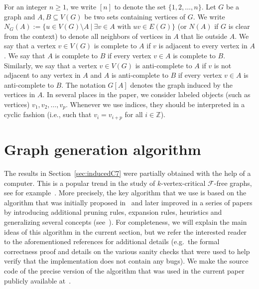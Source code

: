 \documentclass[11pt,a4paper]{article}
\theoremstyle{definition}
\begin{document}
For an integer $n \geq 1$, we write $[n]$ to denote the set $\{1,2,\ldots,n\}$. Let $G$ be a graph and $A, B \subseteq V(G)$ be two sets containing vertices of $G$. We write $N_G(A) := \{u \in V(G) \setminus A~|~ \exists v \in A\text{ with }uv\in E(G)\}$ (or $N(A)$ if $G$ is clear from the context) to denote all neighbors of vertices in $A$ that lie outside $A$. We say that a vertex $v \in V(G)$ is complete to $A$ if $v$ is adjacent to every vertex in $A$. We say that $A$ is complete to $B$ if every vertex $v \in A$ is complete to $B$. Similarly, we say that a vertex $v \in V(G)$ is anti-complete to $A$ if $v$ is not adjacent to any vertex in $A$ and $A$ is anti-complete to $B$ if every vertex $v \in A$ is anti-complete to $B$. The notation $G[A]$ denotes the graph induced by the vertices in $A$. In several places in the paper, we consider labeled objects (such as vertices) $v_1, v_2, \ldots, v_p$. Whenever we use indices, they should be interpreted in a cyclic fashion (i.e., such that $v_i = v_{i+p}$ for all $i \in \mathbb{Z}$).


\section{Graph generation algorithm}\label{sec:algo}
The results in Section~\ref{sec:inducedC7} were partially obtained with the help of a computer. This is a popular trend in the study of $k$-vertex-critical $\mathcal{F}$-free graphs, see for example~\cite{J25}. More precisely, the key algorithm that we use is based on the algorithm that was initially proposed in~\cite{HKLSS10} and later improved in a series of papers by introducing additional pruning rules, expansion rules, heuristics and generalizing several concepts (see~\cite{GS18,GJORS24,XJGH23,XJGH24}). For completeness, we will explain the main ideas of this algorithm in the current section, but we refer the interested reader to the aforementioned references for additional details (e.g.\ the formal correctness proof and details on the various sanity checks that were used to help verify that the implementation does not contain any bugs). We make the source code of the precise version of the algorithm that was used in the current paper publicly available at~\cite{GitHub}.
\end{document}
